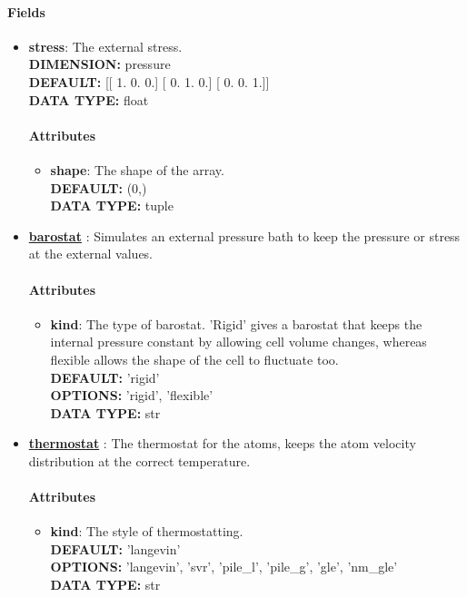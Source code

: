\paragraph{Fields}
 \begin{itemize}
\item {\bf stress}:
 The external stress.
{\\ \bf DIMENSION: }pressure
{\\ \bf DEFAULT: }
      [[ 1.  0.  0.]
       [ 0.  1.  0.]
       [ 0.  0.  1.]]
{\\ \bf DATA TYPE: }float
\paragraph{Attributes}
 \begin{itemize}
\item {\bf shape}:
 The shape of the array.
{\\ \bf DEFAULT: }(0,)
{\\ \bf DATA TYPE: }tuple
\end{itemize}
 
\item {\bf \hyperref[BAROSTAT]{barostat} }:
 Simulates an external pressure bath to keep the pressure or stress at the external values.
\paragraph{Attributes}
 \begin{itemize}
\item {\bf kind}:
 The type of barostat. 'Rigid' gives a barostat that keeps the internal pressure constant by allowing cell volume changes, whereas flexible allows the shape of the cell to fluctuate too.
{\\ \bf DEFAULT: }'rigid'
{\\ \bf OPTIONS: }'rigid', 'flexible'
{\\ \bf DATA TYPE: }str
\end{itemize}
 
\item {\bf \hyperref[THERMOSTATS]{thermostat} }:
 The thermostat for the atoms, keeps the atom velocity distribution at the correct temperature.
\paragraph{Attributes}
 \begin{itemize}
\item {\bf kind}:
 The style of thermostatting.
{\\ \bf DEFAULT: }'langevin'
{\\ \bf OPTIONS: }'langevin', 'svr', 'pile\_l', 'pile\_g', 'gle', 'nm\_gle'
{\\ \bf DATA TYPE: }str
\end{itemize}
 

\end{itemize}
